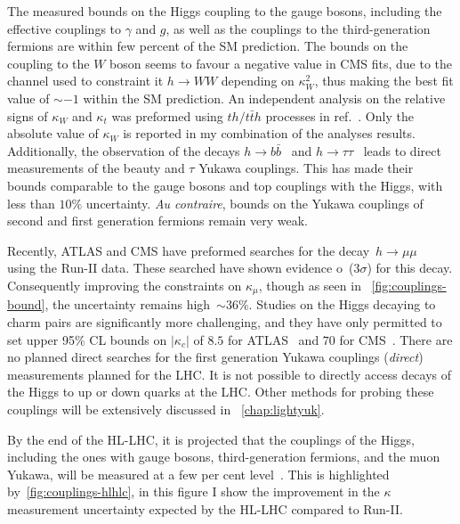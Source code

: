 \par The measured bounds on the Higgs coupling to the gauge bosons, including the effective couplings to $\gamma$ and $g$, as well as the couplings to the third-generation fermions are within few percent of the SM prediction. The bounds on the coupling to the $W$ boson seems to favour a negative value in CMS fits, due to the channel used to constraint it $ h \to WW$  depending on $ \kappa_W^2$, thus making the best fit value of $ \sim -1$ within the SM prediction. An independent analysis on the relative signs of $\kappa_W$ and $\kappa_t$ was preformed using $th/t \bar{t} h$ processes in ref.~\cite{CMS:2018jeh}. Only the absolute value of $\kappa_W$ is reported in my combination of the analyses results.  Additionally,  the observation of the decays $ h \to b \bar{b}$~\cite{CMS:2018nsn,ATLAS:2018kot,ATLAS:2019yhn} and $h \to \tau \tau$~\cite{ATLAS:2018ynr,CMS:2019pyn} leads to direct measurements of the beauty and $\tau$ Yukawa couplings. This has made their bounds comparable to the gauge bosons and top couplings with the Higgs, with less than $10\%$ uncertainty. \textit{ Au contraire}, bounds on the Yukawa couplings of second and first generation fermions remain very weak.  
\par Recently, ATLAS  and CMS have preformed searches for the decay~$ h\to \mu \mu$~\cite{ATLAS:2020fzp,CMS:2020xwi} using the Run-II data. These searched have shown evidence o~($ 3 \sigma$) for  this decay. Consequently improving the constraints on $\kappa_\mu$, though as seen in ~\autoref{fig:couplings-bound}, the uncertainty remains high~$ \sim 36 \%$.  Studies on the Higgs decaying to charm pairs are significantly more challenging, and they have only permitted to set upper 95\% CL  bounds on $ |\kappa_c|$ of $8.5$ for ATLAS~\cite{ATLAS-CONF-2021-021,ATLAS:2022ers} and $70$ for CMS~\cite{CMS:2019hve}. There are no planned direct searches for the first generation Yukawa couplings (\emph{direct}) measurements planned for the LHC. It is not possible to directly access decays of the Higgs to up or down quarks at the LHC. Other methods for probing these couplings will be extensively discussed in ~\autoref{chap:lightyuk}.
\par By the end of the HL-LHC, it is projected that the couplings of the Higgs, including the ones with gauge bosons, third-generation fermions, and the muon Yukawa, will be measured at a few per cent level~\cite{Bernius:2666331}. This is highlighted by~\autoref{fig:couplings-hlhlc}, in this figure I show the improvement in the $\kappa$ measurement uncertainty expected by the HL-LHC compared to Run-II.
